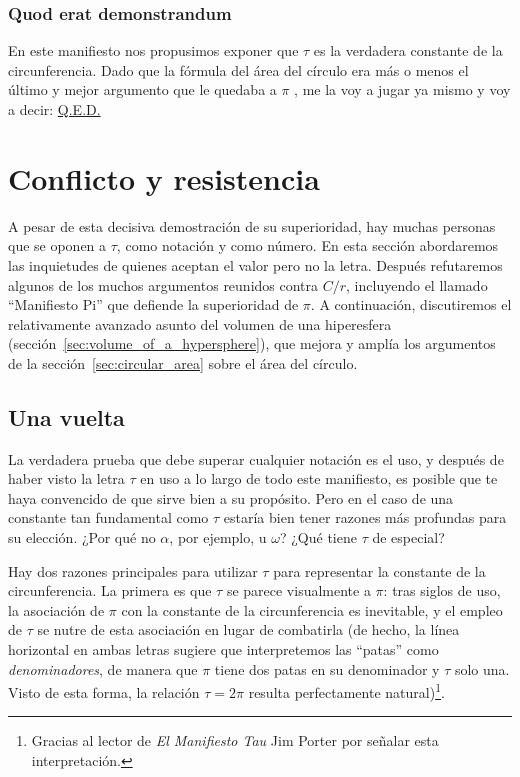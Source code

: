     \subsubsection{Quod erat demonstrandum} %
    \label{sec:quod_erat_demonstrandum}

En este manifiesto nos propusimos exponer que $\tau$ es la verdadera constante de la circunferencia. Dado que la fórmula del área del círculo era más o menos el último y mejor argumento que le quedaba a $\pi$ , me la voy a jugar ya mismo y voy a decir: \href{https://es.wikipedia.org/wiki/Quod_erat_demonstrandum}{Q.E.D.}



\section{Conflicto y resistencia} %
\label{sec:conflict_and_resistance}

A pesar de esta decisiva demostración de su superioridad, hay muchas personas que se oponen a $\tau$, como notación y como número. En esta sección abordaremos las inquietudes de quienes aceptan el valor pero no la letra. Después refutaremos algunos de los muchos argumentos reunidos contra $C/r$, incluyendo el llamado ``Manifiesto Pi'' que defiende la superioridad de $\pi$. A continuación, discutiremos el relativamente avanzado asunto del volumen de una hiperesfera (sección~\ref{sec:volume_of_a_hypersphere}), que mejora y amplía los argumentos de la sección~\ref{sec:circular_area} sobre el área del círculo.

  \subsection{Una vuelta} %
  \label{sec:one_turn}

La verdadera prueba que debe superar cualquier notación es el uso, y después de haber visto la letra $\tau$ en uso a lo largo de todo este manifiesto, es posible que te haya convencido de que sirve bien a su propósito. Pero en el caso de una constante tan fundamental como $\tau$ estaría bien tener razones más profundas para su elección. ¿Por qué no $\alpha$, por ejemplo, u $\omega$? ¿Qué tiene $\tau$ de especial?

Hay dos razones principales para utilizar $\tau$ para representar la constante de la circunferencia. La primera es que $\tau$ se parece visualmente a $\pi$: tras siglos de uso, la asociación de $\pi$ con la constante de la circunferencia es inevitable, y el empleo de $\tau$ se nutre de esta asociación en lugar de combatirla (de hecho, la línea horizontal en ambas letras sugiere que interpretemos las ``patas'' como \emph{denominadores}, de manera que $\pi$ tiene dos patas en su denominador y $\tau$ solo una. Visto de esta forma, la relación $\tau = 2\pi$ resulta perfectamente natural)\footnote{Gracias al lector de \emph{El Manifiesto Tau} Jim Porter por señalar esta interpretación.}.

